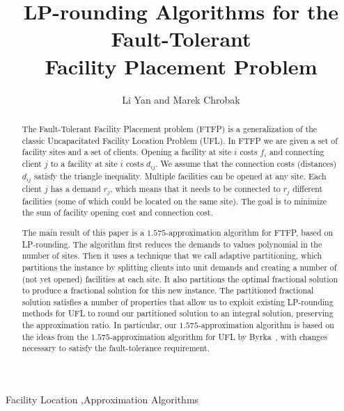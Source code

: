 \documentclass[preprint,12pt]{elsarticle}
\begin{document}
\begin{frontmatter}
  \title{LP-rounding Algorithms for the Fault-Tolerant\\
    Facility Placement Problem} 

\author{Li Yan and Marek Chrobak}
\address{Department of Computer Science\\
 University of California at Riverside\\
Riverside, CA 92521, USA}

\begin{abstract} 
  The Fault-Tolerant Facility Placement problem (FTFP) is a
  generalization of the classic Uncapacitated Facility
  Location Problem (UFL). In FTFP we are given a set of
  facility sites and a set of clients. Opening a facility at
  site $i$ costs $f_i$ and connecting client $j$ to a
  facility at site $i$ costs $d_{ij}$. We assume that the
  connection costs (distances) $d_{ij}$ satisfy the triangle
  inequality. Multiple facilities can be opened at any
  site. Each client $j$ has a demand $r_j$, which means that
  it needs to be connected to $r_j$ different facilities
  (some of which could be located on the same site). The
  goal is to minimize the sum of facility opening cost and
  connection cost.

  The main result of this paper is a $1.575$-approximation algorithm
  for FTFP, based on LP-rounding. The algorithm first reduces the
  demands to values polynomial in the number of sites. Then it uses a
  technique that we call adaptive partitioning, which partitions the
  instance by splitting clients into unit demands and creating a
  number of (not yet opened) facilities at each site. It also
  partitions the optimal fractional solution to produce a fractional
  solution for this new instance.  The partitioned fractional solution
  satisfies a number of properties that allow us to exploit existing
  LP-rounding methods for UFL to round our partitioned solution to an
  integral solution, preserving the approximation ratio.  In
  particular, our $1.575$-approximation algorithm is based on the
  ideas from the $1.575$-approximation algorithm for UFL by
  Byrka~\etal, with changes necessary to satisfy the fault-tolerance
  requirement.
\end{abstract}

\begin{keyword}
Facility Location \sep Approximation Algorithms
\end{keyword}

\end{frontmatter}
\end{document}
